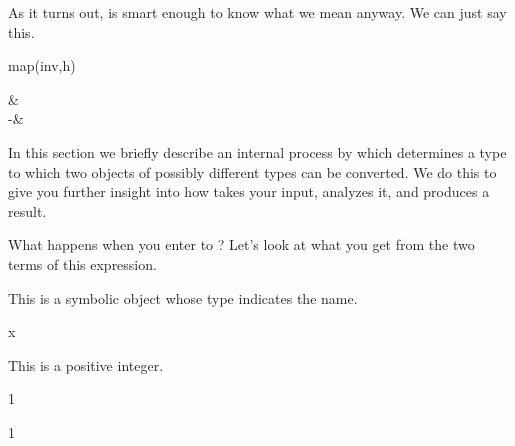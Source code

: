 %
\begin{xtc}
\begin{xtccomment}
As it turns out, \Language{} is smart enough to know what we mean
anyway.
We can just say this.
\end{xtccomment}
\begin{spadsrc}
map(inv,h) 
\end{spadsrc}
\begin{TeXOutput}
\begin{fricasmath}{12}
\begin{MATRIX}{2}&\\-{}&%
\end{MATRIX}%
\end{fricasmath}
\end{TeXOutput}
\end{xtc}


In this section we briefly describe an internal process by which
\Language{} determines a type to which two objects of possibly
different types can be converted.
We do this to give you further insight into how \Language{} takes
your input, analyzes it, and produces a result.

What happens when you enter  to \Language{}?
Let's look at what you get from the two terms of this expression.

\begin{xtc}
\begin{xtccomment}
This is a symbolic object whose type indicates the name.
\end{xtccomment}
\begin{spadsrc}
x
\end{spadsrc}
\begin{TeXOutput}
\begin{fricasmath}{1}
%
\end{fricasmath}
\end{TeXOutput}
\end{xtc}
\begin{xtc}
\begin{xtccomment}
This is a positive integer.
\end{xtccomment}
\begin{spadsrc}
1
\end{spadsrc}
\begin{TeXOutput}
\begin{fricasmath}{2}
1%
\end{fricasmath}
\end{TeXOutput}
\end{xtc}

